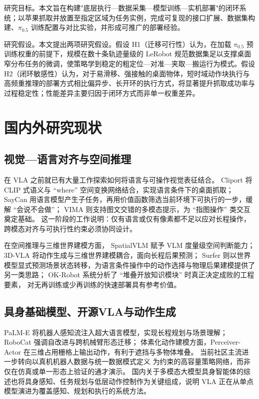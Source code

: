 研究目标。本文旨在构建"底层执行—数据采集—模型训练—实机部署"的闭环系统；以苹果抓取并放置至指定区域为任务实例，完成可复现的接口扩展、数据集构建、$\pi_{0.5}$ 训练配置与对比实验，并形成可推广的部署经验。

研究假设。本文提出两项研究假设。假设 H1（迁移可行性）认为，在加载 $\pi_{0.5}$ 预训练权重的前提下，规模在数十条轨迹量级的 LeRobot 规范数据集足以支撑桌面窄分布任务的微调，使策略学到稳定的粗定位—对准—夹取—搬运行为模式。假设 H2（闭环敏感性）认为，对于易滑移、强接触的桌面物体，短时域动作块执行与高频重推理的部署方式相比偏异步、长开环的执行方式，将显著提升抓取成功率与过程稳定性；性能差异主要归因于闭环方式而非单一权重差异。

\section{国内外研究现状}

\subsection{视觉—语言对齐与空间推理}

在 VLA 之前就已有大量工作探索如何将语言与可操作视觉表征结合。
Cliport\cite{shridhar2021cliport} 将 CLIP 式语义与 ``where'' 空间变换网络结合，实现语言条件下的桌面抓取；
SayCan\cite{ahn2022saycan} 用语言模型产生子任务，再用价值函数筛选当前环境下可执行的一步，缓解 ``会说不会做''；
VIMA\cite{jiang2022vima} 则支持图文交错的多模态提示，为 ``指图操作'' 类交互奠定基础。
这一阶段的工作说明：仅有语言或仅有像素都不足以应对长程操作，跨模态对齐与可执行性约束必须协同设计。

在空间推理与三维世界建模方面，
SpatialVLM\cite{chen2024spatialvlm} 赋予 VLM 度量级空间判断能力；
3D-VLA\cite{zhen20243dvla} 将动作生成与三维世界建模耦合，面向长程后果预测；
Surfer\cite{ren2025surfer} 则以世界模型显式预测场景状态转移，为语言条件操作中的动作选择与物理后果建模提供了另一类思路；
OK-Robot\cite{liu2024okrobot} 系统分析了 ``堆叠开放知识模块'' 时真正决定成败的工程要素，
对无再训练或少再训练的快速部署具有参考价值。

\subsection{具身基础模型、开源VLA与动作生成}

PaLM-E\cite{driess2023palme} 将机器人感知流注入超大语言模型，实现长程规划与场景理解；
RoboCat\cite{bousmalis2023robocat} 强调自改进与跨机械臂形态迁移；
体素化动作建模方面，Perceiver-Actor\cite{shridhar2022perceiveractor} 在三维占用栅格上输出动作，有利于遮挡与多物体堆叠。
当前社区主流进一步转向以真机机器人数据与统一数据模式定义 为约束的高容量策略网络，而非仅在仿真或单一形态上验证的通才演示。
国内关于多模态大模型具身智能体的综述也将具身感知、任务规划与低层动作控制作为关键组成，说明 VLA 正在从单点模型演进为覆盖感知、规划和执行的系统方法\cite{zhao2025multimodalEmbodiedAgentsReview}。

